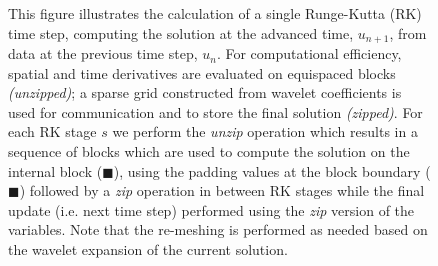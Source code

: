 \documentclass[landscape]{a0poster}
\begin{document}
\begin{textblock}{32}
\begin{textblock}{17}
\begin{figure}
{}
		\caption{This figure illustrates the calculation of
			a single Runge-Kutta (RK)
			time step, computing the solution at the advanced time, $u_{n+1}$, 
			from data at the previous time step, $u_{n}$. For computational 
			efficiency, spatial and time derivatives are evaluated on equispaced
			blocks \textit{(unzipped)}; 
			a sparse grid constructed from wavelet coefficients is used
			for communication and to store the final solution \textit{(zipped)}.
			For each RK stage $s$ we perform the \textit{unzip} operation which results in a sequence of blocks which are used to compute the solution on the internal block (\textcolor{green!70}{$\blacksquare$}), using the padding values at the block boundary (\textcolor{yellow!30}{$\blacksquare$}) followed by a \textit{zip} operation in between RK stages while the final update (i.e. next time step)  performed using the \textit{zip} version of the variables. Note that the re-meshing is performed as needed based on the wavelet expansion of the current solution.  \label{fig:overview}}
	\end{figure}
\end{textblock} 



\end{textblock}
\end{document}
